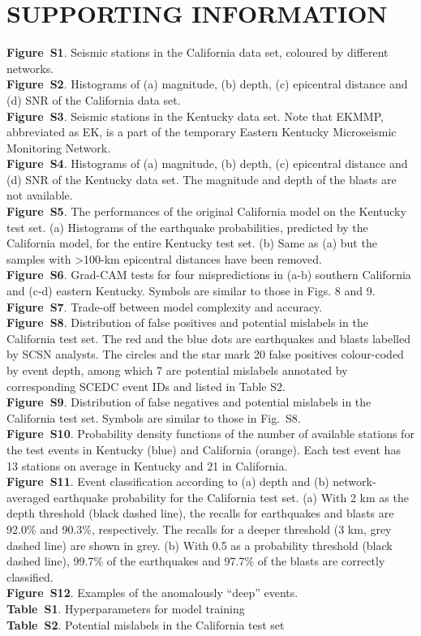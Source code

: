 \documentclass{gji}
\begin{document}
\section*{SUPPORTING INFORMATION}
\textbf{Figure~S1}. Seismic stations in the California data set, coloured by different networks.\\
\textbf{Figure~S2}. Histograms of (a) magnitude, (b) depth, (c) epicentral distance and (d) SNR of the California data set.\\
\textbf{Figure~S3}. Seismic stations in the Kentucky data set. Note that EKMMP, abbreviated as EK, is a part of the temporary Eastern Kentucky Microseismic Monitoring Network.\\
\textbf{Figure~S4}. Histograms of (a) magnitude, (b) depth, (c) epicentral distance and (d) SNR of the Kentucky data set. The magnitude and depth of the blasts are not available.\\
\textbf{Figure~S5}. The performances of the original California model on the Kentucky test set. (a) Histograms of the earthquake probabilities, predicted by the California model, for the entire Kentucky test set. (b) Same as (a) but the samples with \textgreater{100}-km epicentral distances have been removed.\\
\textbf{Figure~S6}. Grad-CAM tests for four mispredictions in (a-b) southern California and (c-d) eastern Kentucky. Symbols are similar to those in Figs. 8 and 9.\\
\textbf{Figure~S7}. Trade-off between model complexity and accuracy.\\
\textbf{Figure~S8}. Distribution of false positives and potential mislabels in the California test set. The red and the blue dots are earthquakes and blasts labelled by SCSN analysts. The circles and the star mark 20 false positives colour-coded by event depth, among which 7 are potential mislabels annotated by corresponding SCEDC event IDs and listed in Table S2.\\
\textbf{Figure~S9}. Distribution of false negatives and potential mislabels in the California test set. Symbols are similar to those in Fig.~S8.\\
\textbf{Figure~S10}. Probability density functions of the number of available stations for the test events in Kentucky (blue) and California (orange). Each test event has 13 stations on average in Kentucky and 21 in California.\\
\textbf{Figure~S11}. Event classification according to (a) depth and (b) network-averaged earthquake probability for the California test set. (a) With 2 km as the depth threshold (black dashed line), the recalls for earthquakes and blasts are 92.0\% and 90.3\%, respectively. The recalls for a deeper threshold (3 km, grey dashed line) are shown in grey. (b) With 0.5 as a probability threshold (black dashed line), 99.7\% of the earthquakes and 97.7\% of the blasts are correctly classified.\\
\textbf{Figure~S12}. Examples of the anomalously ``deep'' events.\\
\textbf{Table~S1}. Hyperparameters for model training\\
\textbf{Table~S2}. Potential mislabels in the California test set\\
\end{document}
